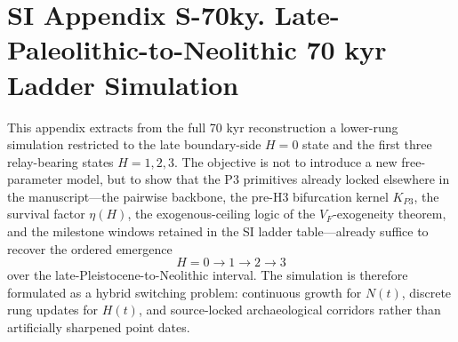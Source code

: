 \documentclass[11pt]{article}
\begin{document}



\section*{SI Appendix S-70ky. Late-Paleolithic-to-Neolithic 70 kyr Ladder Simulation}
\label{sec:S-70ky}This appendix extracts from the full 70 kyr reconstruction a lower-rung simulation restricted to the late boundary-side $H{=}0$ state and the first three relay-bearing states $H{=}1,2,3$. The objective is not to introduce a new free-parameter model, but to show that the P3 primitives already locked elsewhere in the manuscript---the pairwise backbone, the pre-H3 bifurcation kernel $K_{P3}$, the survival factor $\eta(H)$, the exogenous-ceiling logic of the $V_F$-exogeneity theorem, and the milestone windows retained in the SI ladder table---already suffice to recover the ordered emergence\[H=0 \longrightarrow 1 \longrightarrow 2 \longrightarrow 3\]over the late-Pleistocene-to-Neolithic interval. The simulation is therefore formulated as a hybrid switching problem: continuous growth for $N(t)$, discrete rung updates for $H(t)$, and source-locked archaeological corridors rather than artificially sharpened point dates.
\end{document}
